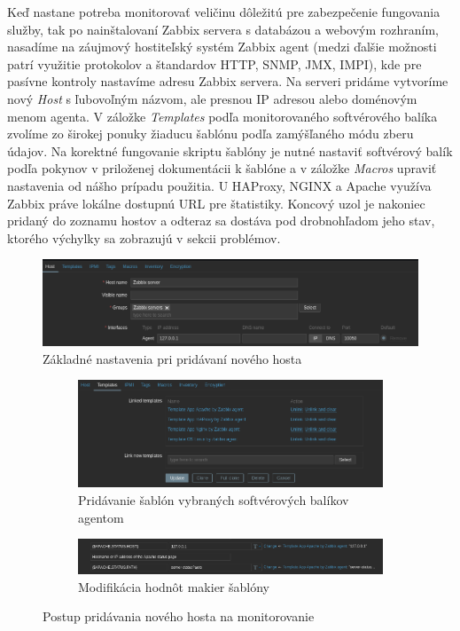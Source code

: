 \documentclass[12pt, a4paper]{article}
\begin{document}
Keď nastane potreba monitorovať veličinu dôležitú pre zabezpečenie fungovania služby, tak po nainštalovaní
Zabbix servera s databázou a webovým rozhraním, nasadíme na záujmový hostiteľský systém Zabbix agent
(medzi ďalšie možnosti patrí využitie protokolov a štandardov HTTP, SNMP, JMX, IMPI), kde pre pasívne 
kontroly nastavíme adresu Zabbix servera. Na serveri pridáme vytvoríme nový \emph{Host} s ľubovoľným názvom, 
ale presnou IP adresou  alebo doménovým menom agenta. V záložke \emph{Templates} podľa monitorovaného 
softvérového balíka zvolíme zo širokej ponuky žiaducu šablónu podľa zamýšľaného módu zberu údajov. Na 
korektné fungovanie skriptu šablóny je nutné nastaviť softvérový balík podľa pokynov v priloženej 
dokumentácii k šablóne a v záložke \emph{Macros} upraviť nastavenia od nášho prípadu použitia. U HAProxy, 
NGINX a Apache využíva Zabbix práve lokálne dostupnú URL pre štatistiky. Koncový uzol je nakoniec pridaný
do zoznamu hostov a odteraz sa dostáva pod drobnohľadom jeho stav, ktorého výchylky sa zobrazujú
v sekcii problémov.
\begin{figure}[h]
	\centering
  	\includegraphics[width=\textwidth]{images/host-config.png}
  	\caption{Základné nastavenia pri pridávaní nového hosta}
\end{figure}

\begin{figure}[h]
	\centering
	\begin{subfigure}[t]{\textwidth}
  		\centering
  		\includegraphics[width=\textwidth]{images/zabbix-templates.png}
  		\caption{Pridávanie šablón vybraných softvérových balíkov agentom}
	\end{subfigure}
	\begin{subfigure}[t]{\textwidth}
  		\centering
  		\includegraphics[width=\textwidth]{images/zabbix-macros.png}
  		\caption{Modifikácia hodnôt makier šablóny}
	\end{subfigure}
	\caption{Postup pridávania nového hosta na monitorovanie}
\end{figure}
\end{document}
